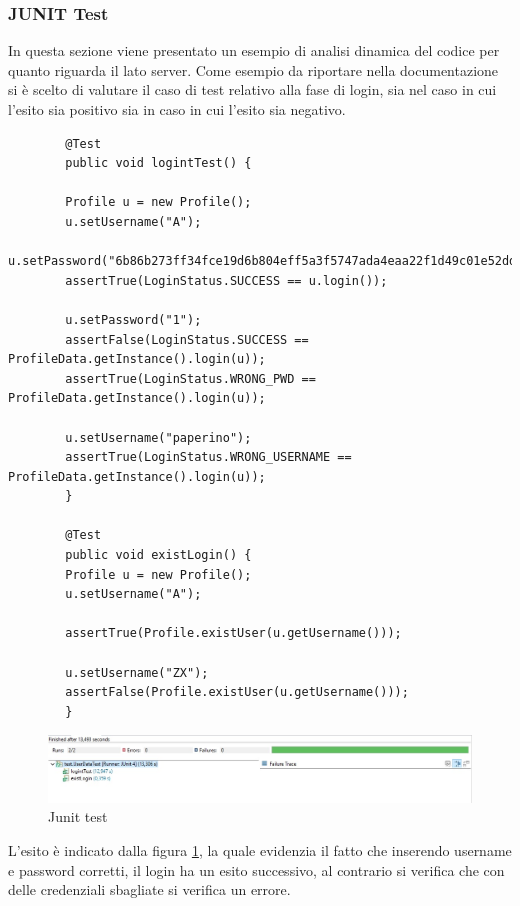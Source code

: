 		\subsubsection{JUNIT Test}
		In questa sezione viene presentato un esempio di analisi dinamica del codice per quanto riguarda il lato server. Come esempio da riportare nella documentazione si è scelto di valutare il caso di test relativo alla fase di login, sia nel caso in cui l'esito sia positivo sia in caso in cui l'esito sia negativo.
		\begin{lstlisting}
		@Test
		public void logintTest() {
		
		Profile u = new Profile();
		u.setUsername("A");
		u.setPassword("6b86b273ff34fce19d6b804eff5a3f5747ada4eaa22f1d49c01e52ddb7875b4b");
		assertTrue(LoginStatus.SUCCESS == u.login());
		
		u.setPassword("1");
		assertFalse(LoginStatus.SUCCESS == ProfileData.getInstance().login(u));
		assertTrue(LoginStatus.WRONG_PWD == ProfileData.getInstance().login(u));
		
		u.setUsername("paperino");
		assertTrue(LoginStatus.WRONG_USERNAME == ProfileData.getInstance().login(u));
		}
		
		@Test
		public void existLogin() {
		Profile u = new Profile();
		u.setUsername("A");
		
		assertTrue(Profile.existUser(u.getUsername()));
		
		u.setUsername("ZX");
		assertFalse(Profile.existUser(u.getUsername()));
		}
		\end{lstlisting}
		\begin{figure}[h!]
			\centering
			\includegraphics[width=\textwidth]{Immagini/Test/Junit_login.jpg}
			\caption{Junit test}
			\label{fig:Junit_login}
		\end{figure}
		L'esito è indicato dalla figura \ref{fig:Junit_login}, la quale evidenzia il fatto che inserendo username e password corretti, il login ha un esito successivo, al contrario si verifica che con delle credenziali sbagliate si verifica un errore.
		
		
